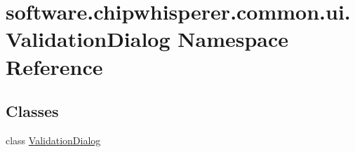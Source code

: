 \hypertarget{namespacesoftware_1_1chipwhisperer_1_1common_1_1ui_1_1ValidationDialog}{}\section{software.\+chipwhisperer.\+common.\+ui.\+Validation\+Dialog Namespace Reference}
\label{namespacesoftware_1_1chipwhisperer_1_1common_1_1ui_1_1ValidationDialog}
\subsection*{Classes}
\begin{DoxyCompactItemize}
\item 
class \hyperlink{classsoftware_1_1chipwhisperer_1_1common_1_1ui_1_1ValidationDialog_1_1ValidationDialog}{Validation\+Dialog}
\end{DoxyCompactItemize}
